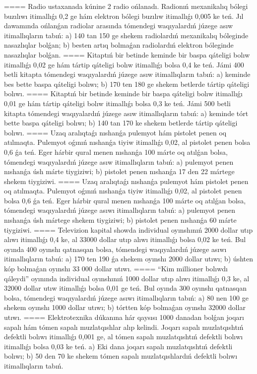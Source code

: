 ====
Radio ustaxanada kúnine 2 radio ońlanadı. Radionıń mexanikalıq bólegi buzılıwı itimallıǵı 0,2 ge hám elektron bólegi buzılıw itimallıǵı 0,005 ke teń. Jıl dawamında ońlanǵan radiolar arasında tómendegi waqıyalardıń júzege asıw itimallıqların tabıń: a) 140 tan 150 ge shekem radiolardıń mexanikalıq bóleginde nasazlıqlar bolǵan; b) besten artıq bolmaǵan radiolardıń elektron bóleginde nasazlıqlar bolǵan.
====
Kitaptıń bir betinde keminde bir baspa qáteligi bolıw itimallıǵı 0,02 ge hám tártip qáteligi bolıw itimallıǵı bolsa 0,4 ke teń. Jámi 400 betli kitapta tómendegi waqıyalardıń júzege asıw itimallıqların tabıń: a) keminde bes bette baspa qáteligi bolıwı; b) 170 ten 180 ge shekem betlerde tártip qáteligi bolıwı.
====
Kitaptıń bir betinde keminde bir baspa qáteligi bolıw itimallıǵı 0,01 ge hám tártip qáteligi bolıw itimallıǵı bolsa 0,3 ke teń. Jámi 500 betli kitapta tómendegi waqıyalardıń júzege asıw itimallıqların tabıń: a) keminde tórt bette baspa qáteligi bolıwı; b) 140 tan 170 ke shekem betlerde tártip qáteligi bolıwı.
====
Uzaq aralıqtaǵı nıshanǵa pulemyot hám pistolet penen oq atılmaqta. Pulemyot oǵınıń nıshanǵa tiyiw itimallıǵı 0,02, al pistolet penen bolsa 0,6 ǵa teń. Eger hárbir qural menen nıshanǵa 100 márte oq atılǵan bolsa, tómendegi waqıyalardıń júzege asıw itimallıqların tabıń: a) pulemyot penen nıshanǵa úsh márte tiygiziwi; b) pistolet penen nıshanǵa 17 den 22 mártege shekem tiygiziwi.
====
Uzaq aralıqtaǵı nıshanǵa pulemyot hám pistolet penen oq atılmaqta. Pulemyot oǵınıń nıshanǵa tiyiw itimallıǵı 0,02, al pistolet penen bolsa 0,6 ǵa teń. Eger hárbir qural menen nıshanǵa 100 márte oq atılǵan bolsa, tómendegi waqıyalardıń júzege asıwı itimallıqların tabıń: a) pulemyot penen nıshanǵa úsh mártege shekem tiygiziwi; b) pistolet penen nıshanǵa 60 márte tiygiziwi.
====
Televizion kapital showda individual oyınshınıń 2000 dollar utıp alıwı itimallıǵı 0,4 ke, al 33000 dollar utıp alıwı itimallıǵı bolsa 0,02 ke teń. Bul oyında 400 oyınshı qatnasqan bolsa, tómendegi waqıyalardıń júzege asıwı itimallıqların tabıń: a) 170 ten 190 ǵa shekem oyınshı 2000 dollar utıwı; b) úshten kóp bolmaǵan oyınshı 33 000 dollar utıwı.
====
“Kim millioner bolıwdı qáleydi” oyınında individual oyınshınıń 1000 dollar utıp alıwı itimallıǵı 0,3 ke, al 32000 dollar utıw itimallıǵı bolsa 0,01 ge teń. Bul oyında 300 oyınshı qatnasqan bolsa, tómendegi waqıyalardıń júzege asıwı itimallıqların tabıń: a) 80 nen 100 ge shekem oyınshı 1000 dollar utıwı; b) tórtten kóp bolmaǵan oyınshı 32000 dollar utıwı.
====
Elektrotexnika dúkanına hár qaysısı 1000 danadan bolǵan joqarı sapalı hám tómen sapalı muzlatqıshlar alıp kelindi. Joqarı sapalı muzlatqıshtıń defektli bolıwı itimallıǵı 0,001 ge, al tómen sapalı muzlatqıshtıń defektli bolıwı itimallıǵı bolsa 0,03 ke teń. a) Eki dana joqarı sapalı muzlatqıshtıń defektli bolıwı; b) 50 den 70 ke shekem tómen sapalı muzlatqıshlardıń defektli bolıwı itimallıqların tabıń.
